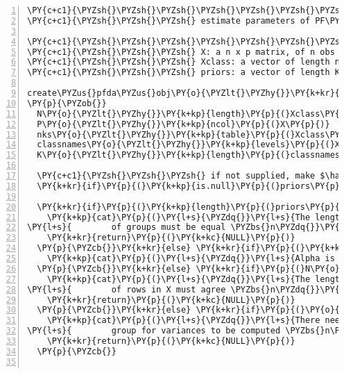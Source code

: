 \begin{Verbatim}[commandchars=\\\{\},codes={\catcode`\$=3\catcode`\^=7\catcode`\_=8},gobble=0,numbers=left,fontfamily=fvm,fontshape=n,fontsize=\footnotesize,tabsize=2]
\PY{c+c1}{\PYZsh{}\PYZsh{}\PYZsh{}\PYZsh{}\PYZsh{}\PYZsh{}\PYZsh{} FUNCTION: create\PYZus{}pfda\PYZus{}obj()}
\PY{c+c1}{\PYZsh{}\PYZsh{}\PYZsh{} estimate parameters of PF\PYZhy{}DA model, so that a discrim function created}

\PY{c+c1}{\PYZsh{}\PYZsh{}\PYZsh{}\PYZsh{}\PYZsh{}\PYZsh{}\PYZsh{} input:}
\PY{c+c1}{\PYZsh{}\PYZsh{}\PYZsh{} X: a n x p matrix, of n obs and p variables}
\PY{c+c1}{\PYZsh{}\PYZsh{}\PYZsh{} Xclass: a vector of length n of the classes (must be a factor variable)}
\PY{c+c1}{\PYZsh{}\PYZsh{}\PYZsh{} priors: a vector of length K (\PYZsh{}classes) with elements in (0,1)}

create\PYZus{}pfda\PYZus{}obj\PY{o}{\PYZlt{}\PYZhy{}}\PY{k+kr}{function}\PY{p}{(}X\PY{p}{,}Xclass\PY{p}{,}lambdar\PY{o}{=}\PY{l+m}{1}\PY{p}{,}priors\PY{o}{=}\PY{k+kc}{NULL}\PY{p}{,}alph\PY{o}{=}\PY{k+kc}{NULL}\PY{p}{,}wts\PY{o}{=}\PY{k+kc}{NULL}\PY{p}{)}
\PY{p}{\PYZob{}}
  N\PY{o}{\PYZlt{}\PYZhy{}}\PY{k+kp}{length}\PY{p}{(}Xclass\PY{p}{)}
  P\PY{o}{\PYZlt{}\PYZhy{}}\PY{k+kp}{ncol}\PY{p}{(}X\PY{p}{)}
  nks\PY{o}{\PYZlt{}\PYZhy{}}\PY{k+kp}{table}\PY{p}{(}Xclass\PY{p}{)}
  classnames\PY{o}{\PYZlt{}\PYZhy{}}\PY{k+kp}{levels}\PY{p}{(}Xclass\PY{p}{)}
  K\PY{o}{\PYZlt{}\PYZhy{}}\PY{k+kp}{length}\PY{p}{(}classnames\PY{p}{)}
  
  \PY{c+c1}{\PYZsh{}\PYZsh{}\PYZsh{} if not supplied, make $\hat{\pi}_k$ data proportions}
  \PY{k+kr}{if}\PY{p}{(}\PY{k+kp}{is.null}\PY{p}{(}priors\PY{p}{)}\PY{p}{)} priors\PY{o}{\PYZlt{}\PYZhy{}}nks\PY{o}{/}N
  
  \PY{k+kr}{if}\PY{p}{(}\PY{k+kp}{length}\PY{p}{(}priors\PY{p}{)}\PY{o}{!=}K\PY{p}{)}\PY{p}{\PYZob{}}
    \PY{k+kp}{cat}\PY{p}{(}\PY{l+s}{\PYZdq{}}\PY{l+s}{The length of priors and the total number }
\PY{l+s}{        of groups must be equal \PYZbs{}n\PYZdq{}}\PY{p}{)}
    \PY{k+kr}{return}\PY{p}{(}\PY{k+kc}{NULL}\PY{p}{)}
  \PY{p}{\PYZcb{}}\PY{k+kr}{else} \PY{k+kr}{if}\PY{p}{(}\PY{k+kp}{is.null}\PY{p}{(}alph\PY{p}{)} \PY{o}{\PYZam{}} \PY{p}{(}N\PY{o}{\PYZlt{}}P\PY{p}{)}\PY{p}{)}\PY{p}{\PYZob{}}
    \PY{k+kp}{cat}\PY{p}{(}\PY{l+s}{\PYZdq{}}\PY{l+s}{Alpha is suggested for n\PYZlt{}p data \PYZbs{}n\PYZdq{}}\PY{p}{)}
  \PY{p}{\PYZcb{}}\PY{k+kr}{else} \PY{k+kr}{if}\PY{p}{(}N\PY{o}{!=}\PY{k+kp}{nrow}\PY{p}{(}X\PY{p}{)}\PY{p}{)}\PY{p}{\PYZob{}}
    \PY{k+kp}{cat}\PY{p}{(}\PY{l+s}{\PYZdq{}}\PY{l+s}{The length of Xclass and the number }
\PY{l+s}{        of rows in X must agree \PYZbs{}n\PYZdq{}}\PY{p}{)}
    \PY{k+kr}{return}\PY{p}{(}\PY{k+kc}{NULL}\PY{p}{)}
  \PY{p}{\PYZcb{}}\PY{k+kr}{else} \PY{k+kr}{if}\PY{p}{(}\PY{o}{!}\PY{k+kp}{all}\PY{p}{(}nks\PY{o}{\PYZgt{}}\PY{l+m}{1}\PY{p}{)}\PY{p}{)}\PY{p}{\PYZob{}}
    \PY{k+kp}{cat}\PY{p}{(}\PY{l+s}{\PYZdq{}}\PY{l+s}{There needs to be at least two obs in each }
\PY{l+s}{        group for variances to be computed \PYZbs{}n\PYZdq{}}\PY{p}{)}
    \PY{k+kr}{return}\PY{p}{(}\PY{k+kc}{NULL}\PY{p}{)}
  \PY{p}{\PYZcb{}}


\end{Verbatim}

